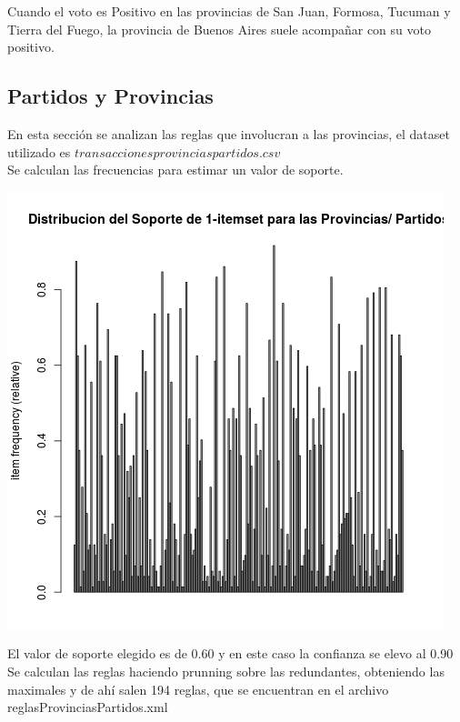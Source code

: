 \documentclass{endm}
\begin{document}
Cuando el voto es Positivo en las provincias de San Juan, Formosa, Tucuman y Tierra del Fuego, la provincia de Buenos Aires suele acompañar con su voto positivo. \\


\subsection{Partidos y Provincias}

En esta sección se analizan las reglas que involucran a las provincias, el dataset utilizado es $transaccionesprovinciaspartidos.csv$ \\

Se calculan las frecuencias para estimar un valor de soporte. \\

\begin{center}
\includegraphics[scale=0.4]{graficos/soportesProvinciasPartidos.png}
\end{center}

El valor de soporte elegido es de 0.60 y en este caso la confianza se elevo al 0.90\\

Se calculan las reglas haciendo prunning sobre las redundantes, obteniendo las maximales y de ahí salen 194 reglas, que se encuentran en el archivo reglasProvinciasPartidos.xml \\
\end{document}
